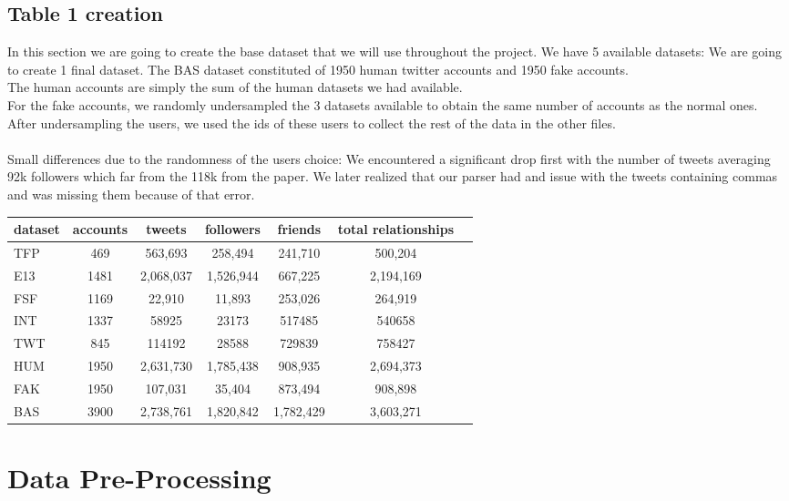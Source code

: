 \documentclass[a4paper,11pt]{article}
\begin{document}
\subsection{Table 1 creation}
In this section we are going to create the base dataset that we will use throughout the project.
We have 5 available datasets: 
We are going to create 1 final dataset. The BAS dataset constituted of 1950 human twitter accounts and 1950 fake accounts.\\ The human accounts are simply the sum of the human datasets we had available.\\
For the fake accounts, we randomly undersampled the 3 datasets available to obtain the same number of accounts as the normal ones.\\
After undersampling the users, we used the ids of these users to collect the rest of the data in the other files.\\\\
Small differences due to the randomness of the users choice:
We encountered a significant drop first with the number of tweets averaging 92k followers which far from the 118k from the paper. We later realized that our parser had and issue with the tweets containing commas and was missing them because of that error.\\

\begin{tabular}{lcccccc}
dataset & accounts & tweets & followers & friends & total relationships \\
\hline
TFP & 469 & 563,693 & 258,494 & 241,710 & 500,204 \\
E13 & 1481 & 2,068,037 & 1,526,944 & 667,225 & 2,194,169 \\
FSF & 1169 & 22,910 & 11,893 & 253,026 & 264,919 \\
INT & 1337 & 58925 & 23173 & 517485 & 540658 \\
TWT & 845 & 114192 & 28588 & 729839 & 758427 \\
\hline
HUM & 1950 & 2,631,730 & 1,785,438 & 908,935 & 2,694,373 \\
FAK & 1950 & 107,031 & 35,404 & 873,494 & 908,898 \\
\hline
BAS & 3900 & 2,738,761 & 1,820,842 & 1,782,429 & 3,603,271 \\
\end{tabular}


\section{Data Pre-Processing}
\end{document}
